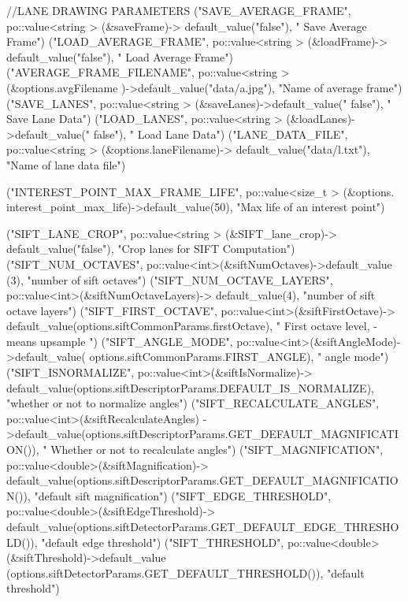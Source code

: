 \begin{DoxyCode}
{            //LANE DRAWING PARAMETERS
            ("SAVE_AVERAGE_FRAME", po::value<string > (&saveFrame)->
      default_value("false"), " Save Average Frame")
            ("LOAD_AVERAGE_FRAME", po::value<string > (&loadFrame)->
      default_value("false"), " Load Average Frame")
            ("AVERAGE_FRAME_FILENAME", po::value<string > (&options.avgFilename
      )->default_value("data/a.jpg"), "Name of average frame")
            ("SAVE_LANES", po::value<string > (&saveLanes)->default_value("
      false"), " Save Lane Data")
            ("LOAD_LANES", po::value<string > (&loadLanes)->default_value("
      false"), " Load Lane Data")
            ("LANE_DATA_FILE", po::value<string > (&options.laneFilename)->
      default_value("data/l.txt"), "Name of lane data file")


            ("INTEREST_POINT_MAX_FRAME_LIFE", po::value<size_t > (&options.
      interest_point_max_life)->default_value(50), "Max life of an interest point")

            ("SIFT_LANE_CROP", po::value<string > (&SIFT_lane_crop)->
      default_value("false"), "Crop lanes for SIFT Computation")
            ("SIFT_NUM_OCTAVES", po::value<int>(&siftNumOctaves)->default_value
      (3), "number of sift octaves")
            ("SIFT_NUM_OCTAVE_LAYERS", po::value<int>(&siftNumOctaveLayers)->
      default_value(4), "number of sift octave layers")
            ("SIFT_FIRST_OCTAVE", po::value<int>(&siftFirstOctave)->
      default_value(options.siftCommonParams.firstOctave), " First octave level, - means upsample
      ")
            ("SIFT_ANGLE_MODE", po::value<int>(&siftAngleMode)->default_value(
      options.siftCommonParams.FIRST_ANGLE), " angle mode")
            ("SIFT_ISNORMALIZE", po::value<int>(&siftIsNormalize)->
      default_value(options.siftDescriptorParams.DEFAULT_IS_NORMALIZE), "whether or not to
       normalize angles")
            ("SIFT_RECALCULATE_ANGLES", po::value<int>(&siftRecalculateAngles)
      ->default_value(options.siftDescriptorParams.GET_DEFAULT_MAGNIFICATION()), "
      Whether or not to recalculate angles")
            ("SIFT_MAGNIFICATION", po::value<double>(&siftMagnification)->
      default_value(options.siftDescriptorParams.GET_DEFAULT_MAGNIFICATION()), "default
       sift magnification")
            ("SIFT_EDGE_THRESHOLD", po::value<double>(&siftEdgeThreshold)->
      default_value(options.siftDetectorParams.GET_DEFAULT_EDGE_THRESHOLD()), "default
       edge threshold")
            ("SIFT_THRESHOLD", po::value<double>(&siftThreshold)->default_value
      (options.siftDetectorParams.GET_DEFAULT_THRESHOLD()), "default threshold")


}
\end{DoxyCode}
